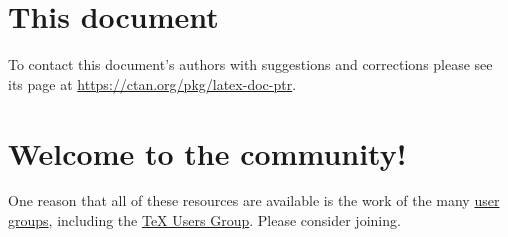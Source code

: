 \documentclass[11pt]{article}
\begin{document}
\begin{multicols*}{2}
\section{This document}
To contact this document's authors with suggestions and corrections 
please see its page at 
\url{https://ctan.org/pkg/latex-doc-ptr}.


\section{Welcome to the community!}

One reason that all of these resources are available is 
the work of the many
\href{https://tug.org/usergroups.html}{user groups}, 
including the \href{https://tug.org/}{\TeX{} Users Group}.
Please consider joining.

\vspace*{2ex}
\noindent{\color{lightblue}\rule{\linewidth}{0.4pt}}

\theendnotes

\end{multicols*}
\end{document}
